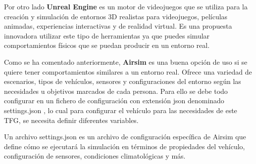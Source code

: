 Por otro lado \textbf{Unreal Engine} es un motor de videojuegos que se utiliza para la creación y simulación de entornos 3D realistas para videojuegos,
películas animadas, experiencias interactivas y de realidad virtual. Es una propuesta innovadora utilizar este tipo de herramientas ya que puedes simular 
comportamientos físicos que se puedan producir en un entorno real. 

Como se ha comentado anteriormente, \textbf{Airsim} es una buena opción de uso si se quiere tener comportamientos
similares a un entorno real. Ofrece una variedad de escenarios, tipos de vehículos, sensores y configuraciones del entorno 
según las necesidades u objetivos marcados de cada persona. 
Para ello se debe todo configurar en un fichero de configuración con extensión json denominado settings.json , lo cual para configurar
el vehículo para las necesidades de este TFG, se necesita definir diferentes variables. 

Un archivo settings.json es un archivo de configuración específica de Airsim que define cómo 
se ejecutará la simulación en términos de propiedades del vehículo, configuración de sensores, condiciones climatológicas y más. 


